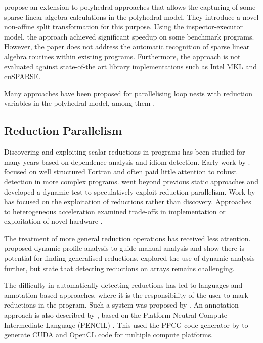     \citet{Zhang:2016:CTG:3018843.3018849} propose an extension to polyhedral
    approaches that allows the capturing of some sparse linear algebra
    calculations in the polyhedral model.
    They introduce a novel non-affine split transformation for this purpose.
    Using the inspector-executor model, the approach achieved significant
    speedup on some benchmark programs.
    However, the paper does not address the automatic recognition of sparse
    linear algebra routines within existing programs.
    Furthermore, the approach is not evaluated against state-of-the art
    library implementations such as Intel MKL and cuSPARSE.

    Many approaches have been proposed for parallelising loop nests with
    reduction variables in the polyhedral model, among them
    \citet{jouvelot1989unified,redon1994scheduling,chi1997optimizing,
    gupta2006simplifying,stock2014framework}.

\subsection{Reduction Parallelism}

    Discovering and exploiting scalar reductions in programs has been studied
    for many years based on dependence analysis and idiom detection.
    Early work by
    \citet{pottenger1995idiom,suganuma1996detection,fisher1994parallelizing}.
    focused on well structured Fortran and often paid little attention to robust
    detection in more complex programs.
    \citet{rauchwerger1999lrpd} went beyond previous static approaches and
    developed a dynamic test to speculatively exploit reduction parallelism.
    Work by
    \citet{Gutierrez:2000,gutierrez2003optimization,gutierrez2008analytical}
    has focused on the exploitation of reductions rather than discovery.
    Approaches to heterogeneous acceleration examined trade-offs in
    implementation \citep{yu2006adaptive} or exploitation of novel hardware
    \citep{ravi2010compiler,Huo2011HiPC}.

    The treatment of more general reduction operations has received less
    attention.
    \citet{das2010experiences} proposed dynamic profile analysis to guide
    manual analysis and show there is potential for finding generalised
    reductions.
    \citet{kim2012dynamic} explored the use of dynamic analysis further,
    but state that detecting reductions on arrays remains challenging.

    The difficulty in automatically detecting reductions has led to languages
    and annotation based approaches, where it is the responsibility of the user
    to mark reductions in the program.
    Such a system was proposed by \citet{deitz2002high}.
    An annotation approach is also described by \citet{Reddy2016Reduction},
    based on the Platform-Neutral Compute Intermediate Language (PENCIL)
    \citep{baghdadi2015PENCIL}.
    This used the PPCG code generator by
    \citet{Verdoolaege:2013:PPC:2400682.2400713} to generate CUDA and OpenCL
    code for multiple compute platforms.

